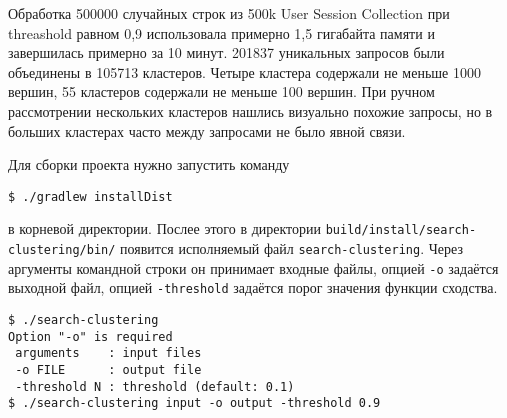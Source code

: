 \documentclass{article}
\begin{document}
Обработка 500000 случайных строк из 500k User Session Collection при threashold равном 0,9 использовала примерно 1,5 гигабайта памяти
и завершилась примерно за 10 минут.
201837 уникальных запросов были объединены в 105713 кластеров.
Четыре кластера содержали не меньше 1000 вершин,
55 кластеров содержали не меньше 100 вершин.
При ручном рассмотрении нескольких кластеров нашлись визуально похожие запросы,
но в больших кластерах часто между запросами не было явной связи.

Для сборки проекта нужно запустить команду
\begin{verbatim}
$ ./gradlew installDist
\end{verbatim}
в корневой директории.
Послее этого в директории \texttt{build/install/search-clustering/bin/} появится исполняемый файл \texttt{search-clustering}.
Через аргументы командной строки он принимает входные файлы,
опцией \texttt{-o} задаётся выходной файл,
опцией \texttt{-threshold} задаётся порог значения функции сходства.
\begin{verbatim}
$ ./search-clustering                                                          
Option "-o" is required
 arguments    : input files
 -o FILE      : output file
 -threshold N : threshold (default: 0.1)
$ ./search-clustering input -o output -threshold 0.9
\end{verbatim}
\end{document}
